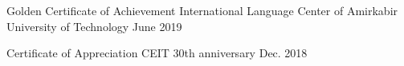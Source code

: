 

\begin{cvhonors}

  \cvhonor
    {Golden Certificate of Achievement} %
    {International Language Center of Amirkabir University of Technology} %
    {} %
    {June 2019} %

  \cvhonor
    {Certificate of Appreciation} %
    {CEIT 30th anniversary} %
    {} %
    {Dec. 2018} %

\end{cvhonors}